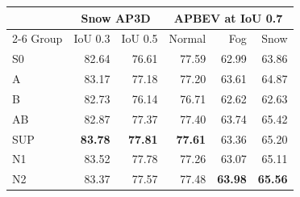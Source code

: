 \begin{tabular}{|l|r|r|r|r|r|}
\hline
 & \multicolumn{2}{c|}{Snow AP3D} & \multicolumn{3}{c|}{APBEV at IoU 0.7} \\
\cline{2-6}
Group & IoU 0.3 & IoU 0.5 & Normal & Fog & Snow \\
\hline
S0 & 82.64 & 76.61 & 77.59 & 62.99 & 63.86 \\
A & 83.17 & 77.18 & 77.20 & 63.61 & 64.87 \\
B & 82.73 & 76.14 & 76.71 & 62.62 & 62.63 \\
AB & 82.87 & 77.37 & 77.40 & 63.74 & 65.42 \\
SUP & \textbf{83.78} & \textbf{77.81} & \textbf{77.61} & 63.36 & 65.20 \\
N1 & 83.52 & 77.78 & 77.26 & 63.07 & 65.11 \\
N2 & 83.37 & 77.57 & 77.48 & \textbf{63.98} & \textbf{65.56} \\
\hline
\end{tabular}
